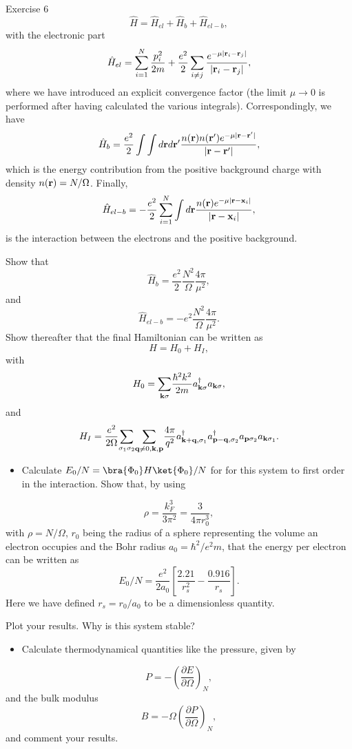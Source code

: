 \documentclass{beamer}
\begin{document}
\begin{frame}
\begin{block}{Exercise 6 }
\noindent
\[
\hat{H}=\hat{H}_{el}+\hat{H}_{b}+\hat{H}_{el-b},
\]
with the electronic part
\[
\hat{H}_{el}=\sum_{i=1}^N\frac{p_i^2}{2m}+\frac{e^2}{2}\sum_{i\ne j}\frac{e^{-\mu |{\bf r}_i-{\bf r}_j|}}{|{\bf r}_i-{\bf r}_j|},
\]
where we have introduced an explicit convergence factor
(the limit $\mu\rightarrow 0$ is performed after having calculated the various integrals).
Correspondingly, we have
\[
\hat{H}_{b}=\frac{e^2}{2}\int\int d{\bf r}d{\bf r}'\frac{n({\bf r})n({\bf r}')e^{-\mu |{\bf r}-{\bf r}'|}}{|{\bf r}-{\bf r}'|},
\]
which is the energy contribution from the positive background charge with density
$n({\bf r})=N/\Omega$. Finally,
\[
\hat{H}_{el-b}=-\frac{e^2}{2}\sum_{i=1}^N\int d{\bf r}\frac{n({\bf r})e^{-\mu |{\bf r}-{\bf x}_i|}}{|{\bf r}-{\bf x}_i|},
\]
is the interaction between the electrons and the positive background.

Show that
\[
\hat{H}_{b}=\frac{e^2}{2}\frac{N^2}{\Omega}\frac{4\pi}{\mu^2},
\]
and
\[
\hat{H}_{el-b}=-e^2\frac{N^2}{\Omega}\frac{4\pi}{\mu^2}.
\]
Show thereafter that the final Hamiltonian can be written as 
\[
H=H_{0}+H_{I},
\]
with
\[
H_{0}={\displaystyle\sum_{{\bf k}\sigma}}
\frac{\hbar^{2}k^{2}}{2m}a_{{\bf k}\sigma}^{\dagger}
a_{{\bf k}\sigma},
\]
and
\[
H_{I}=\frac{e^{2}}{2\Omega}{\displaystyle\sum_{\sigma_{1}
\sigma_{2}}}{\displaystyle
\sum_{{\bf q}\neq 0,{\bf k},{\bf p}}}\frac{4\pi}{q^{2}}
a_{{\bf k}+{\bf q},\sigma_{1}}^{\dagger}
a_{{\bf p}-{\bf q},\sigma_{2}}^{\dagger}
a_{{\bf p}\sigma_{2}}a_{{\bf k}\sigma_{1}}.
\] 
\begin{itemize}
 \item Calculate $E_0/N=\bra{\Phi_{0}}H\ket{\Phi_{0}}/N$ for for this system to first order in the interaction. Show that, by using
\end{itemize}

\noindent
\[
\rho= \frac{k_F^3}{3\pi^2}=\frac{3}{4\pi r_0^3},
\]
with $\rho=N/\Omega$, $r_0$
being the radius of a sphere representing the volume an electron occupies 
and the Bohr radius $a_0=\hbar^2/e^2m$, 
that the energy per electron can be written as 
\[
E_0/N=\frac{e^2}{2a_0}\left[\frac{2.21}{r_s^2}-\frac{0.916}{r_s}\right].
\]
Here we have defined
$r_s=r_0/a_0$ to be a dimensionless quantity.

Plot your results. Why is this system stable?
\begin{itemize}
 \item Calculate thermodynamical quantities like the pressure, given by
\end{itemize}

\noindent
\[
P=-\left(\frac{\partial E}{\partial \Omega}\right)_N,
\]
and the bulk modulus
\[
B=-\Omega\left(\frac{\partial P}{\partial \Omega}\right)_N,
\]
and comment your results.

\end{block}
\end{frame}
\end{document}
